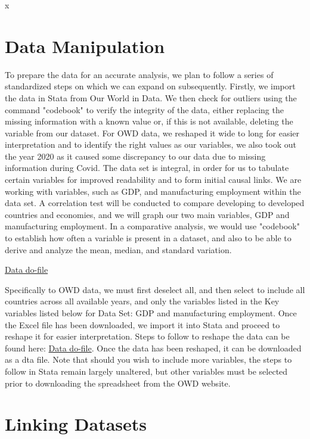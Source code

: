 x\documentclass[12pt]{article}
\begin{document}
\section{Data Manipulation}
\label{sec:data}

To prepare the data for an accurate analysis, we plan to follow a series of standardized steps on which we can expand on subsequently. Firstly, we import the data in Stata from Our World in Data. We then check for outliers using the command "codebook" to verify the integrity of the data, either replacing the missing information with a known value or, if this is not available, deleting the variable from our dataset.  For OWD data, we reshaped it wide to long for easier interpretation and to identify the right values as our variables, we also took out the year 2020 as it caused some discrepancy to our data due to missing information during Covid. 
The data set is integral, in order for us to tabulate certain variables for improved readability and to form initial causal links. We are working with variables, such as GDP, and manufacturing employment within the data set. A correlation test will be conducted to compare developing to developed countries and economies, and we will graph our two main variables, GDP and manufacturing employment. In a comparative analysis, we would use "codebook" to establish how often a variable is present in a dataset, and also to be able to derive and analyze the mean, median, and standard variation.



\href{https://github.com/ecn310/course-project-development/blob/main/WDI.do}{Data do-file} 


Specifically to OWD data, we must first deselect all, and then select to include all countries across all available years, and only the variables listed in the Key variables listed below for Data Set: GDP and manufacturing employment. Once the Excel file has been downloaded, we import it into Stata and proceed to reshape it for easier interpretation. Steps to follow to reshape the data can be found here: \href{https://github.com/ecn310/course-project-development/blob/main/WDI.do}{Data do-file}.
Once the data has been reshaped, it can be downloaded as a dta file. Note that should you wish to include more variables, the steps to follow in Stata remain largely unaltered, but other variables must be selected prior to downloading the spreadsheet from the OWD website. 


\section{Linking Datasets}
\label{sec:discussion}
\end{document}
